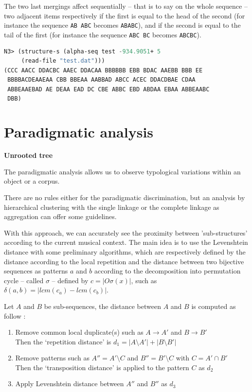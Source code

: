 The two last mergings affect sequentially -- that is to say on the whole sequence -- two adjacent items respectively if the first is equal to the head of the second (for instance the sequence \texttt{AB ABC} becomes \texttt{ABABC}), and if the second is equal to the tail of the first (for instance the sequence \texttt{ABC BC} becomes \texttt{ABCBC}).

\begin{lstlisting}[language=Lisp]
N3> (structure-s (alpha-seq test -934.9051+ 5  
     (read-file "test.dat"))) 
(CCC AACC DDACBC AAEC DDACAA BBBBBB EBB BDAC AAEBB BBB EE
 BBBBACDEAAEAA CBB BBEAA AABBAD ABCC ACEC DDACDBAE CDAA
 ABBEAAEBAD AE DEAA EAD DC CBE ABBC EBD ABDAA EBAA ABBEAABC 
 DBB)
\end{lstlisting}

\section{Paradigmatic analysis}
\label{paradigm}

\textbf{Unrooted tree}
\smallskip

The paradigmatic analysis allows us to observe typological variations within an object or a corpus.

There are no rules either for the paradigmatic discrimination, but an analysis by hierarchical clustering with the single linkage or the complete linkage as aggregation can offer some guidelines.

With this approach, we can accurately see the proximity between 'sub-structures' according to the current musical context. The main idea is to use the Levenshtein distance with some preliminary algorithms, which are respectively defined by the distance according to the local repetition and the distance between two bijective sequences as patterns $a$ and $b$ according to the decomposition into permutation cycle \citep{pc} -- called $\sigma$ -- defined by $c = | O\sigma(x) |$, such as $\delta(a,b) = | lcm(c_a) - lcm(c_b) |$.

\smallskip

Let $A$ and $B$ be sub-sequences, the distance between $A$ and $B$ is computed as follow :
\begin{enumerate}
  \item Remove common local duplicate(s) such as $A \rightarrow A'$ and $B \rightarrow B'$\\ Then the `repetition distance' is $d_1 = | A \setminus A' | + | B \setminus B' |$
  \item Remove patterns such as $A'' = A' \setminus C$ and $B'' = B' \setminus C$ with $C = A' \cap B'$\\ Then the `transposition distance' is applied to the pattern $C$ as $d_2$
  \item Apply Levenshtein distance between $A''$ and $B''$ as $d_3$
\end{enumerate}

